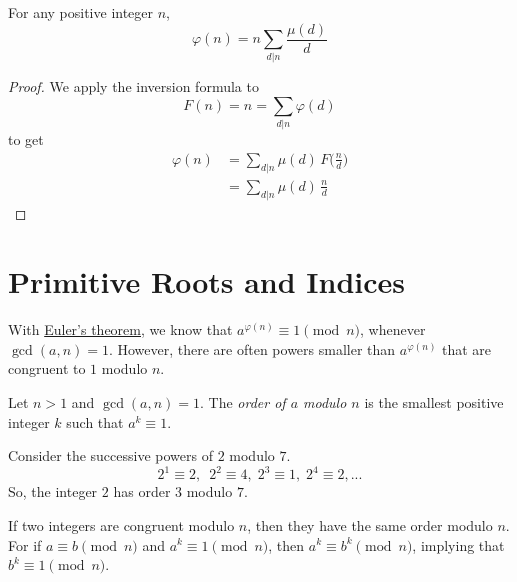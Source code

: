 \documentclass{article}
\newcounter{theorem}[section]
\newcounter{definition}[section]
\newcounter{example}[section]
\begin{document}
\begin{theorem}
  \label{thm:totient-as-a-mobius-divisor-sum}
For any positive integer $n$, 
\begin{equation}
  \varphi(n) = n \sum_{d|n} \frac{\mu(d)}{d}
\end{equation}
\end{theorem}
\begin{proof}
We apply the inversion formula to
\begin{equation}
  F(n) = n = \sum_{d|n} \varphi(d)
\end{equation}
to get
\begin{align*}
    \varphi(n) & = \sum_{d|n} \mu(d) \,F \bigg( \frac{n}{d} \bigg) \\
    & = \sum_{d|n} \mu(d) \, \frac{n}{d}
\end{align*}
\end{proof}

\section{Primitive Roots and Indices}

With \hyperref[thm:eulers-theorem]{Euler's theorem}, we know that $a^{\varphi(n)} \equiv 1 \pmod{n}$, whenever $\gcd(a, n) = 1$. However, there are often powers smaller than $a^{\varphi(n)}$ that are congruent to $1$ modulo $n$. 

\begin{definition}
  \label{def:order-of-a-modulo-n}
Let $n>1$ and $\gcd(a, n) = 1$. The \textit{order of $a$ modulo $n$} is the smallest positive integer $k$ such that $a^k \equiv 1$. 
\end{definition}

\begin{example}
  \label{ex:powers-of-2-modulo-7}
Consider the successive powers of $2$ modulo $7$. 
\begin{equation}
  2^1 \equiv 2, \;\ 2^2 \equiv 4, \; 2^3 \equiv 1, \; 2^4 \equiv 2, ...
\end{equation}
So, the integer $2$ has order $3$ modulo $7$. 
\end{example}

\begin{lemma}
  \label{thm:congruent-integers-share-an-order}
If two integers are congruent modulo $n$, then they have the same order modulo $n$. For if $a \equiv b \pmod{n}$ and $a^k \equiv 1 \pmod{n}$, then $a^k \equiv b^k \pmod{n}$, implying that $b^k \equiv 1 \pmod{n}$. 
\end{lemma}
\end{document}
